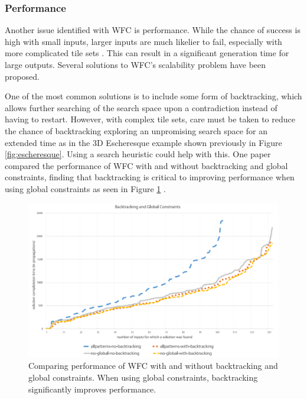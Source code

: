 
\subsubsection{Performance}\label{sec:performance}
Another issue identified with WFC is performance. While the chance of success is high with small inputs, larger inputs are much likelier to fail, especially with more complicated tile sets \cite{WFC_ConstraintSolving_and_ML}. This can result in a significant generation time for large outputs. Several solutions to WFC's scalability problem have been proposed.%

One of the most common solutions is to include some form of backtracking, which allows further searching of the search space upon a contradiction instead of having to restart. However, with complex tile sets, care must be taken to reduce the chance of backtracking exploring an unpromising search space for an extended time as in the 3D Escheresque example shown previously in Figure \ref{fig:escheresque}. Using a search heuristic could help with this. One paper compared the performance of WFC with and without backtracking and global constraints, finding that backtracking is critical to improving performance when using global constraints as seen in Figure \ref{fig:backtrackingPerformance} \cite{WFC_ConstraintSolving_and_ML}.

\begin{figure}[H]
        \centering
        \includegraphics[width=\textwidth, height=0.3\textheight, keepaspectratio]{Images/BacktrackingPerformance.png}
        \caption{Comparing performance of WFC with and without backtracking and global constraints. When using global constraints, backtracking significantly improves performance. \cite{WFC_ConstraintSolving_and_ML}}
        \label{fig:backtrackingPerformance}
\end{figure}

